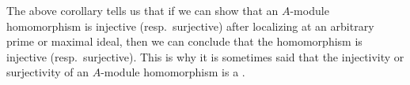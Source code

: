 \documentclass{ximera}
\begin{document}
The above corollary tells us that if we can show that an $A$-module homomorphism is injective (resp.\ surjective) after localizing at an arbitrary prime or maximal ideal, then we can conclude that the homomorphism is injective (resp.\ surjective). This is why it is sometimes said that the injectivity or surjectivity of an $A$-module homomorphism is a .
\end{document}
